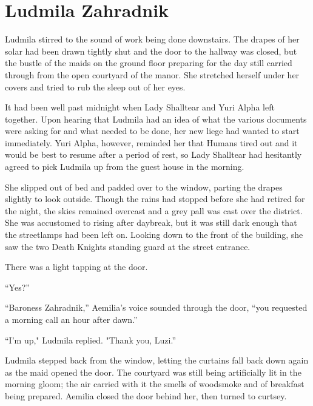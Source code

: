 \chapter{Ludmila Zahradnik}

Ludmila stirred to the sound of work being done downstairs. The drapes of her solar had been drawn tightly shut and the door to the hallway was closed, but the bustle of the maids on the ground floor preparing for the day still carried through from the open courtyard of the manor. She stretched herself under her covers and tried to rub the sleep out of her eyes.

 

It had been well past midnight when Lady Shalltear and Yuri Alpha left together. Upon hearing that Ludmila had an idea of what the various documents were asking for and what needed to be done, her new liege had wanted to start immediately. Yuri Alpha, however, reminded her that Humans tired out and it would be best to resume after a period of rest, so Lady Shalltear had hesitantly agreed to pick Ludmila up from the guest house in the morning.

 

She slipped out of bed and padded over to the window, parting the drapes slightly to look outside. Though the rains had stopped before she had retired for the night, the skies remained overcast and a grey pall was cast over the district. She was accustomed to rising after daybreak, but it was still dark enough that the streetlamps had been left on. Looking down to the front of the building, she saw the two Death Knights standing guard at the street entrance.

 

There was a light tapping at the door.

 

“Yes?”

 

“Baroness Zahradnik,” Aemilia’s voice sounded through the door, “you requested a morning call an hour after dawn.”

 

“I’m up," Ludmila replied. "Thank you, Luzi.”

 

Ludmila stepped back from the window, letting the curtains fall back down again as the maid opened the door. The courtyard was still being artificially lit in the morning gloom; the air carried with it the smells of woodsmoke and of breakfast being prepared. Aemilia closed the door behind her, then turned to curtsey.


